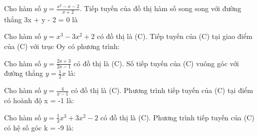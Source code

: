 \begin{vnmultiplechoice}[ rearrange=yes, keycolumns=5]
	\begin{question}%
		Cho hàm số $y = \frac{{x^2  - x - 2}}{{x + 2}}$. Tiếp tuyến của đồ thị hàm số song song với đường thẳng 3x + y - 2 = 0 là

		\datcot[2]
		\bonpa
		{}
		{}
		{}
		{}
	\end{question}

	\begin{question}%
		Cho hàm số $y = x^3-3x^2+2$ có đồ thị là (C). Tiếp tuyến của (C) tại giao điểm của (C) với trục Oy có phương trình:

		\datcot
		\bonpa
		{}
		{}
		{}
		{}
	\end{question}

	\begin{question}%
		Cho hàm số $y = \frac{{2x + 3}}{{2x - 1}}$ có đồ thị là (C). Số tiếp tuyến của (C) vuông góc với đường thẳng $y = \frac{1}{2}x$ là:

		\datcot
		\bonpa
		{}
		{}
		{}
		{}
	\end{question}

	\begin{question}%
		Cho hàm số $y = \frac{{4}}{{x - 1}}$ có đồ thị là (C). Phương trình tiếp tuyến của (C) tại điểm có hoành độ x = -1 là:

		\datcot
		\bonpa
		{}
		{}
		{}
		{}
	\end{question}


	\begin{question}%
		Cho hàm số $y = \frac{{1}}{{3}}x^3+3x^2-2$ có đồ thị là (C). Phương trình tiếp tuyến của (C) có hệ số góc k = -9 là:

		\datcot
		\bonpa
		{}
		{}
		{}
		{}
	\end{question}

\end{vnmultiplechoice}


% 






